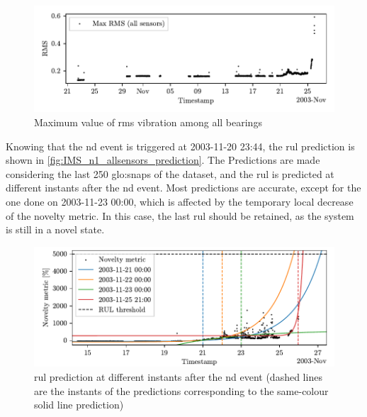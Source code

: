 \begin{figure}
    \centering
    \includegraphics{images/IMS/Novelty_01_RMS_allsensors.pdf}
    \caption{Maximum value of \gls{rms} vibration among all bearings}
    \label{fig:IMS_n1_allsensors_RMS}
\end{figure}

Knowing that the \gls{nd} event is triggered at 2003-11-20 23:44, the \gls{rul} prediction is shown in \autoref{fig:IMS_n1_allsensors_prediction}. The Predictions are made considering the last 250 \gls{glo:snap}s of the dataset, and the \gls{rul} is predicted at different instants after the \gls{nd} event. Most predictions are accurate, except for the one done on 2003-11-23 00:00, which is affected by the temporary local decrease of the novelty metric. In this case, the last \gls{rul} should be retained, as the system is still in a novel state.

\begin{figure}
    \centering
    \includegraphics[width=\textwidth]{images/IMS/Novelty_01_500samples_allsensors_predictions.pdf}
    \caption{\gls{rul} prediction at different instants after the \gls{nd} event (dashed lines are the instants of the predictions corresponding to the same-colour solid line prediction)}
    \label{fig:IMS_n1_allsensors_prediction}
\end{figure}